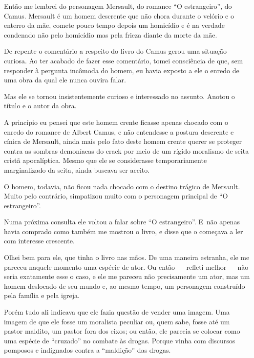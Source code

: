 Então me lembrei do personagem Mersault, do romance ``O estrangeiro'',
do Camus. Mersault é um homem descrente que não chora durante o velório
e o enterro da mãe, comete pouco tempo depois um homicídio e é na
verdade condenado não pelo homicídio mas pela frieza diante da morte da
mãe.

\asterisc{}

De repente o comentário a respeito do livro do Camus gerou uma situação
curiosa. Ao ter acabado de fazer esse comentário, tomei consciência de
que, sem responder à pergunta incômoda do homem, eu havia exposto a ele
o enredo de uma obra da qual ele nunca ouvira falar.

Mas ele se tornou insistentemente curioso e interessado no assunto.
Anotou o título e o autor da obra.

A princípio eu pensei que este homem crente ficasse apenas chocado com o
enredo do romance de Albert Camus, e não entendesse a postura descrente
e cínica de Mersault, ainda mais pelo fato deste homem crente querer se
proteger contra as sombras demoníacas do crack por meio de um rígido
moralismo de seita cristã apocalíptica. Mesmo que ele se considerasse
temporariamente marginalizado da seita, ainda buscava ser aceito.

O homem, todavia, não ficou nada chocado com o destino trágico de
Mersault. Muito pelo contrário, simpatizou muito com o personagem
principal de ``O estrangeiro''.

\asterisc{}

Numa próxima consulta ele voltou a falar sobre ``O estrangeiro''. E~não
apenas havia comprado como também me mostrou o livro, e disse que o
começava a ler com interesse crescente.

Olhei bem para ele, que tinha o livro nas mãos. De uma maneira estranha,
ele me pareceu naquele momento uma espécie de ator. Ou então --- refleti
melhor --- não seria exatamente esse o caso, e ele me pareceu não
precisamente um ator, mas um homem deslocado de seu mundo e, ao mesmo
tempo, um personagem construído pela família e pela igreja.

Porém tudo ali indicava que ele fazia questão de vender uma imagem. Uma
imagem de que ele fosse um moralista peculiar ou, quem sabe, fosse até
um pastor maldito, um pastor fora dos eixos; ou então, ele parecia se
colocar como uma espécie de ``cruzado'' no combate às drogas. Porque
vinha com discursos pomposos e indignados contra a ``maldição'' das
drogas.

\asterisc{}


